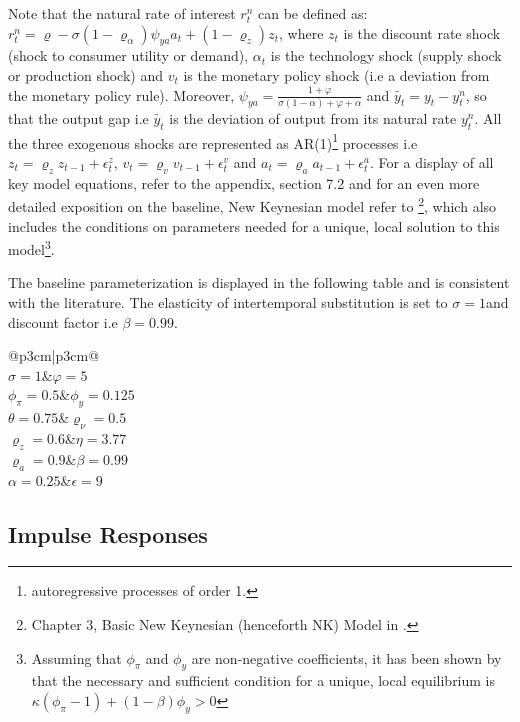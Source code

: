 \documentclass[12pt]{article}
\makeatletter
\newcommand\Taccount[3][3cm]%
{{\renewcommand\arraystretch{1.3}%
		\begin{adjustbox}{width=0.4\textwidth}
		\begin{tabular}[t]{@{}p{#1}|p{#1}@{}}
			\multicolumn{2}{@{}c@{}}{#2}\\
			\hline
			\hline
			#3
		\end{tabular}%
		\end{adjustbox}
	
}}
\newcommand{\1}{\mathbbm 1}
\renewcommand{\rho}{\varrho}
\makeatother
\begin{document}
Note that the natural rate of interest $r_{t}^{n}$ can be defined as: $r_{t}^{n} = \rho - \sigma (1 - \rho_{\alpha}) \psi_{ya} a_{t} + (1 - \rho_{z}) z_{t}$, where $z_{t}$ is the discount rate shock (shock to consumer utility or demand), $\alpha_{t}$ is the technology shock (supply shock or production shock) and $v_{t}$ is the monetary policy shock (i.e a deviation from the monetary policy rule). Moreover, $\psi_{ya} = \frac{1 + \varphi}{\sigma (1 - \alpha) + \varphi + \alpha}$ and $\widetilde{y_{t}} = y_{t} - y_{t}^{n}$, so that the output gap i.e $\widetilde{y_{t}}$ is the deviation of output from its natural rate $ y_{t}^{n}$. All the three exogenous shocks are represented as AR(1)\footnote{autoregressive processes of order 1.} processes i.e $z_{t} = \rho_{z} z_{t-1} + \epsilon_{t}^{z}$, $v_{t} = \rho_{v} v_{t-1} + \epsilon_{t}^{v}$ and $a_{t} = \rho_{a} a_{t-1} + \epsilon_{t}^{a}$. For a display of all key model equations, refer to the appendix, section 7.2 and for an even more detailed exposition on the baseline, New Keynesian model refer to \cite{gali2015book}\footnote{Chapter 3, Basic New Keynesian (henceforth NK) Model in \cite{gali2015book}.}, which also includes the conditions on parameters needed for a unique, local solution to this model\footnote{Assuming that $\phi_{\pi}$ and $\phi_{y}$ are non-negative coefficients, it has been shown by \cite{bullard2002learning} that the necessary and sufficient condition for a unique, local equilibrium is $\kappa (\phi_{\pi} - 1) + (1 - \beta) \phi_{y} > 0$}. 

The baseline parameterization is displayed in the following table and is consistent with the literature. The elasticity of intertemporal substitution is set to $\sigma = 1$and discount factor i.e $\beta = 0.99$.

	\begin{center}
	\Taccount{NK Model Parameters}{$\sigma = 1$&$\varphi = 5$\\$\phi_{\pi} = 0.5$&$\phi_{y}=0.125$\\$\theta = 0.75$&$\rho_{\nu} = 0.5$\\$\rho_{z} = 0.6$&$\eta=3.77$\\$\rho_{a} = 0.9$&$\beta=0.99$\\$\alpha=0.25$&$\epsilon=9$}
\end{center}


\subsection{Impulse Responses}
\end{document}
